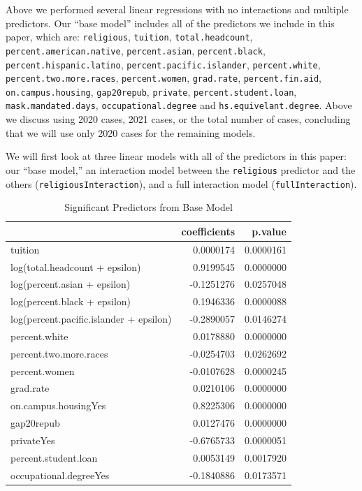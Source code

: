 \documentclass[
]{article}
\begin{document}
Above we performed several linear regressions with no interactions and
multiple predictors. Our ``base model'' includes all of the predictors
we include in this paper, which are: \texttt{religious},
\texttt{tuition}, \texttt{total.headcount},
\texttt{percent.american.native}, \texttt{percent.asian},
\texttt{percent.black}, \texttt{percent.hispanic.latino},
\texttt{percent.pacific.islander}, \texttt{percent.white},
\texttt{percent.two.more.races}, \texttt{percent.women},
\texttt{grad.rate}, \texttt{percent.fin.aid},
\texttt{on.campus.housing}, \texttt{gap20repub}, \texttt{private},
\texttt{percent.student.loan}, \texttt{mask.mandated.days},
\texttt{occupational.degree} and \texttt{hs.equivelant.degree}. Above we
discuss using 2020 cases, 2021 cases, or the total number of cases,
concluding that we will use only 2020 cases for the remaining models.

We will first look at three linear models with all of the predictors in
this paper: our ``base model,'' an interaction model between the
\texttt{religious} predictor and the others
(\texttt{religiousInteraction}), and a full interaction model
(\texttt{fullInteraction}).

\begin{table}

\caption{\label{tab:unnamed-chunk-18}Significant Predictors from Base Model}
\centering
\begin{tabular}[t]{l|r|r}
\hline
  & coefficients & p.value\\
\hline
tuition & 0.0000174 & 0.0000161\\
\hline
log(total.headcount + epsilon) & 0.9199545 & 0.0000000\\
\hline
log(percent.asian + epsilon) & -0.1251276 & 0.0257048\\
\hline
log(percent.black + epsilon) & 0.1946336 & 0.0000088\\
\hline
log(percent.pacific.islander + epsilon) & -0.2890057 & 0.0146274\\
\hline
percent.white & 0.0178880 & 0.0000000\\
\hline
percent.two.more.races & -0.0254703 & 0.0262692\\
\hline
percent.women & -0.0107628 & 0.0000245\\
\hline
grad.rate & 0.0210106 & 0.0000000\\
\hline
on.campus.housingYes & 0.8225306 & 0.0000000\\
\hline
gap20repub & 0.0127476 & 0.0000000\\
\hline
privateYes & -0.6765733 & 0.0000051\\
\hline
percent.student.loan & 0.0053149 & 0.0017920\\
\hline
occupational.degreeYes & -0.1840886 & 0.0173571\\
\hline
\end{tabular}
\end{table}
\end{document}
